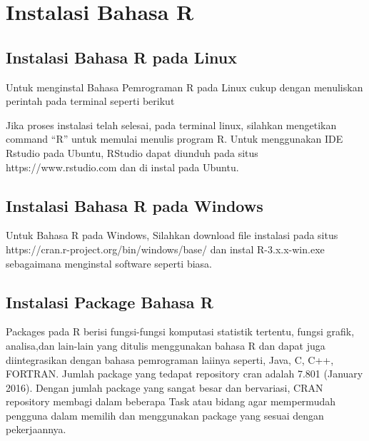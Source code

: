 \section{Instalasi Bahasa R}

\subsection{Instalasi Bahasa R pada Linux}

Untuk menginstal Bahasa Pemrograman R pada Linux  cukup dengan menuliskan perintah pada terminal seperti berikut

Jika proses instalasi telah selesai, pada terminal linux, silahkan mengetikan command “R” untuk memulai menulis program R.
Untuk menggunakan IDE Rstudio pada Ubuntu, RStudio dapat diunduh pada situs https://www.rstudio.com dan di instal pada Ubuntu.

\subsection{Instalasi Bahasa R pada Windows}

Untuk Bahasa R pada Windows, Silahkan download file instalasi pada situs https://cran.r-project.org/bin/windows/base/ dan instal R-3.x.x-win.exe sebagaimana menginstal software seperti biasa.

\subsection{Instalasi Package Bahasa R}
Packages pada R berisi fungsi-fungsi komputasi statistik tertentu, fungsi grafik, analisa,dan lain-lain yang ditulis menggunakan bahasa R dan dapat juga diintegrasikan dengan bahasa pemrograman laiinya seperti, Java, C, C++, FORTRAN. Jumlah package yang tedapat repository cran adalah 7.801 (January 2016).  Dengan jumlah package yang sangat besar dan bervariasi, CRAN repository membagi dalam beberapa Task atau bidang agar mempermudah pengguna dalam memilih dan menggunakan package yang sesuai dengan pekerjaannya.

